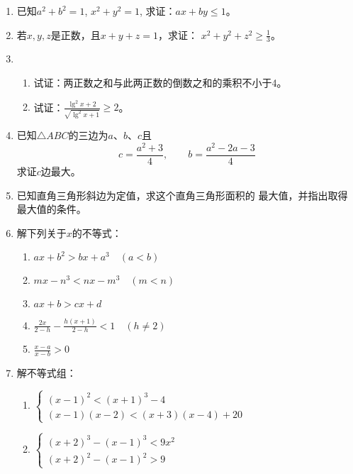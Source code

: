 \begin{enumerate}
\item 已知$a^2+b^2=1$, $x^2+y^2=1$, 求证：$ax+by\le 1$。
\item 若$x,y,z$是正数，且$x+y+z=1$，求证：
$x^2+y^2+z^2\ge \frac{1}{3}$。
\item \begin{enumerate}
    \item 试证：两正数之和与此两正数的倒数之和的乘积不小于4。
    \item 试证：$\frac{\lg^2x+2}{\sqrt{\lg^2x+1}}\ge 2$。
\end{enumerate}
\item 已知$\triangle ABC$的三边为$a$、$b$、$c$且
\[c=\frac{a^2+3}{4},\qquad b=\frac{a^2-2a-3}{4}\]
求证$c$边最大。
\item 
已知直角三角形斜边为定值，求这个直角三角形面积的
最大值，并指出取得最大值的条件。
\item 
解下列关于$x$的不等式：
\begin{multicols}{2}
\begin{enumerate}
    \item $ax+b^2>bx+a^3\quad (a<b)$
    \item $mx-n^3<nx-m^3\quad (m<n)$
    \item $ax+b>cx+d$
    \item $\frac{2x}{2-h}-\frac{h(x+1)}{2-h}<1\quad (h\ne 2)$
    \item $\frac{x-a}{x-b}>0$
\end{enumerate}
\end{multicols}
\item 解不等式组：
\begin{enumerate}
    \item $\begin{cases}
        (x-1)^2<(x+1)^3-4\\(x-1)(x-2)<(x+3)(x-4)+20
    \end{cases}$
    \item $\begin{cases}
        (x+2)^3-(x-1)^3<9x^2 \\(x+2)^2-(x-1)^2>9
    \end{cases}$
\end{enumerate}


\end{enumerate}
